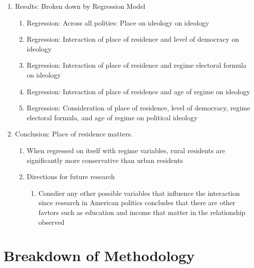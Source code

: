 \documentclass[12pt]{article}
\begin{document}
\begin{enumerate}
\begin{enumerate}
	\item Data: CSES Module 4 \url{http://www.cses.org/datacenter/module4/module4.htm}
	\item Cases: The cases that are considered in this study are based on those available in the CSES dataset.\footnote{The CSES provides a brief synopsis of the elections that were used for the data collection here" \url{http://www.cses.org/datacenter/module4/data/cses4_codebook_part5_election_summaries.txt}.}
	\item Methodology: See Section 2 for detailed breakdown
\end{enumerate}
\item Results: Broken down by Regression Model
\begin{enumerate}
	\item Regression: Across all polities: Place on ideology on ideology
	\item Regression: Interaction of place of residence and level of democracy on ideology
	\item Regression: Interaction of place of residence and regime electoral formula on ideology
	\item Regression: Interaction of place of residence and age of regime on ideology
	\item Regression: Consideration of place of residence, level of democracy, regime electoral formula, and age of regime on political ideology
\end{enumerate}
\item Conclusion: Place of residence matters.
\begin{enumerate}
	\item When regressed on itself with regime variables, rural residents are significantly more conservative than urban residents
	\item Directions for future research
	\begin{enumerate}
		\item Consdier any other possible variables that influence the interaction since research in American politics concludes that there are other favtors such as education and income that matter in the relationship observed \citep{gimpel_rural_2006}
	\end{enumerate}
\end{enumerate}
\end{enumerate}

\section{Breakdown of Methodology}
\end{document}
